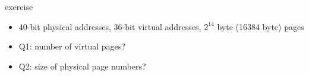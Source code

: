 \begin{frame}{exercise}
    \begin{itemize}
    \item 40-bit physical addresses, 36-bit virtual addresses, $2^{14}$ byte (16384 byte) pages
    \vspace{.5cm}
    \item Q1: number of virtual pages?
    \item Q2: size of physical page numbers?
    \end{itemize}
\end{frame}
